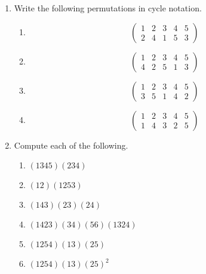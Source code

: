 {\small
\begin{enumerate}
 
 
 
\item %
Write the following permutations in cycle notation.
\begin{multicols}{2}
\begin{enumerate}
 
\item
\[
\begin{pmatrix}
1 & 2 & 3 & 4 & 5 \\
2 & 4 & 1 & 5 & 3
\end{pmatrix}
\]

\item
\[
\begin{pmatrix}
1 & 2 & 3 & 4 & 5 \\
4 & 2 & 5 & 1 & 3
\end{pmatrix}
\]

\item
\[
\begin{pmatrix}
1 & 2 & 3 & 4 & 5 \\
3 & 5 & 1 & 4 & 2
\end{pmatrix}
\]

\item
\[
\begin{pmatrix}
1 & 2 & 3 & 4 & 5 \\
1 & 4 & 3 & 2 & 5
\end{pmatrix}
\]

\end{enumerate}
\end{multicols}


 
 \item  %
Compute each of the following.
\begin{multicols}{2}
\begin{enumerate}
 
\item
$(1345)(234)$
  
\item
$(12)(1253)$

\item
$(143)(23)(24)$

\item
$(1423)(34)(56)(1324)$

\item
$(1254)(13)(25)$

 
\item
$(1254) (13)(25)^2$
 

\end{enumerate}
\end{multicols}
\end{enumerate}}
